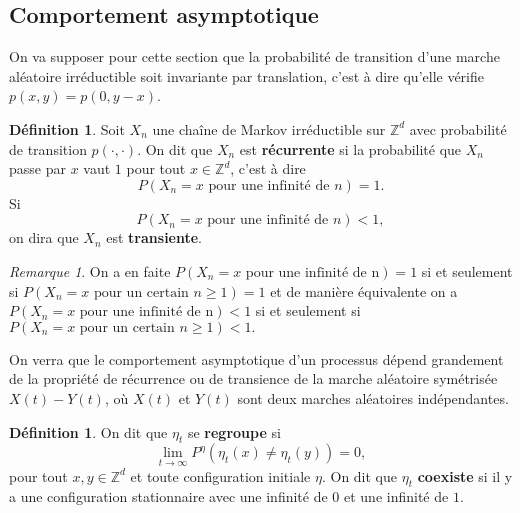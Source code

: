 \documentclass[a4paper,11pt]{article}
\theoremstyle{break}
\theoremstyle{break}
\theoremstyle{definition}
\newtheorem{definition}[theorem]{Définition}
\theoremstyle{remark}
\newtheorem{remarque}[theorem]{Remarque}
\begin{document}
\subsection{Comportement asymptotique}
On va supposer pour cette section que la probabilité de transition  d'une marche aléatoire irréductible soit invariante par translation, c'est à dire qu'elle vérifie $p(x,y)=p(0,y-x)$. 

\begin{definition} %
Soit $X_n$ une chaîne de Markov irréductible sur $\mathbb{Z}^d$ avec probabilité de transition $p(\cdot,\cdot)$. On dit que $X_n$ est \textbf{récurrente} si la probabilité que $X_n$ passe par $x$ vaut $1$ pour tout $x\in\mathbb{Z}^d$, c'est à dire
$$
P(X_n=x \text{ pour une infinité de }n ) =1.
$$
Si
$$
P(X_n=x \text{ pour une infinité de }n ) <1,
$$
on dira que $X_n$ est \textbf{transiente}.
\end{definition}

\begin{remarque}
On a en faite $P(X_n=x \text{ pour une infinité de n} ) =1 $ si et seulement si $P(X_n=x \text{ pour un certain }n\geq 1 ) =1 $ et de manière équivalente on a $P(X_n=x \text{ pour une infinité de n} ) <1 $ si et seulement si $P(X_n=x \text{ pour un certain }n\geq 1 ) <1. $
\end{remarque}

On verra que le comportement asymptotique d'un processus dépend grandement de la propriété de récurrence ou de transience de la marche aléatoire symétrisée $X(t)-Y(t)$, où $X(t)$ et $Y(t)$ sont deux marches aléatoires indépendantes.

\begin{definition}
On dit que $\eta_t$ se \textbf{regroupe} si%
$$
\lim_{t\rightarrow\infty}P^{\eta}(\eta_t (x) \neq\eta_t (y))=0,
$$
pour tout $x,y\in\mathbb{Z}^d$ et toute configuration initiale $\eta$.
On dit que $\eta_t$ \textbf{coexiste} si il y a une configuration stationnaire avec une infinité de $0$ et une infinité de $1$.
\end{definition}
\end{document}
